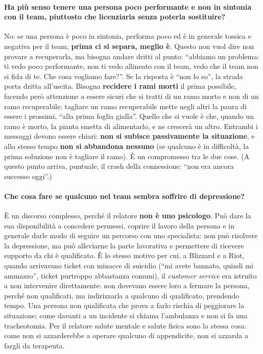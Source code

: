 \paragraph{Ha più senso tenere una persona poco performante e non in sintonia con il team, piuttosto che
licenziarla senza poterla sostituire?} No: se una persona è poco in sintonia, performa poco ed è in generale
tossica e negativa per il team, \textbf{prima ci si separa, meglio è}. Questo non vuol dire non provare a
recuperarla, ma bisogna andare dritti al punto: ``abbiamo un problema: ti vedo poco performante, non ti vedo
allineato con il team, vedo che il team non si fida di te. Che cosa vogliamo fare?''. Se la risposta è ``non lo
so'', la strada porta dritta all'uscita. Bisogna \textbf{recidere i rami morti} il prima possibile, facendo
però attenzione a essere sicuri che si tratti di un ramo morto e non di un ramo recuperabile: tagliare un ramo
recuperabile mette negli altri la paura di essere i prossimi, ``alla prima foglia gialla''. Quello che si
vuole è che, quando un ramo è morto, la pianta smetta di alimentarlo, e ne crescerà un altro. Entrambi i
messaggi devono essere chiari: \textbf{non si subisce passivamente la situazione}, e allo stesso tempo
\textbf{non si abbandona nessuno} (se qualcuno è in difficoltà, la prima soluzione non è tagliare il ramo). È
un compromesso tra le due cose. (A questo punto arriva, puntuale, il crash della connessione: ``non era ancora
successo oggi''.)

\paragraph{Che cosa fare se qualcuno nel team sembra soffrire di depressione?} È un discorso complesso, perché
il relatore \textbf{non è uno psicologo}. Può dare la sua disponibilità a concedere permessi, coprire il lavoro
della persona e in generale darle modo di seguire un percorso con uno specialista: non può risolvere la
depressione, ma può alleviarne la parte lavorativa e permettere di ricevere supporto da chi è qualificato. È lo
stesso motivo per cui, a Blizzard e a Riot, quando arrivavano ticket con minacce di suicidio (``mi avete
bannato, quindi mi ammazzo'', ticket purtroppo abbastanza comuni), il \emph{customer service} era istruito a
non intervenire direttamente: non dovevano essere loro a fermare la persona, perché non qualificati, ma
indirizzarla a qualcuno di qualificato, prendendo tempo. Una persona non qualificata che prova a farlo rischia
di peggiorare la situazione; come davanti a un incidente si chiama l'ambulanza e non si fa una tracheotomia.
Per il relatore salute mentale e salute fisica sono la stessa cosa: come non si azzarderebbe a operare qualcuno
di appendicite, non si azzarda a fargli da terapeuta.


